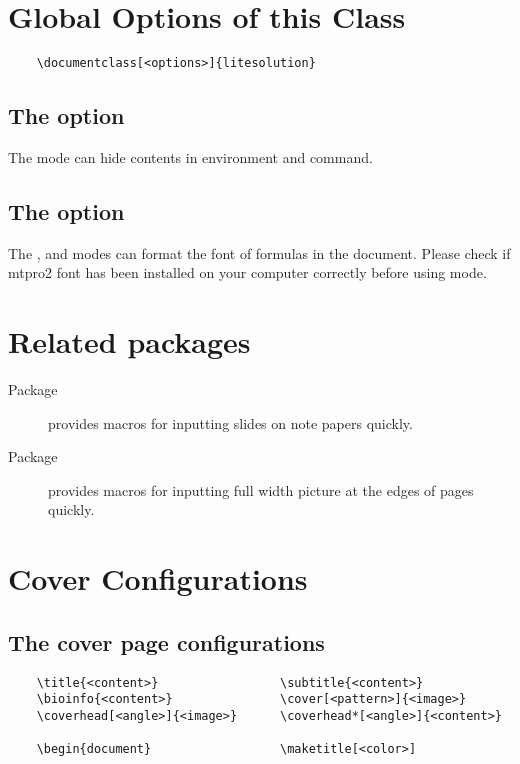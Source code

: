 \documentclass[mtpro2]{litesolution}
\begin{document}
\section{Global Options of this Class}

\begin{verbatim}
    \documentclass[<options>]{litesolution}
\end{verbatim}

\subsection{The  option}

The  mode can hide contents in  environment and  command.

\subsection{The  option}

The ,  and  modes can format the font of formulas in the document. Please check if mtpro2 font has been installed on your computer correctly before using  mode.

\section{Related packages}
\begin{description}
    \item[Package ] provides macros for inputting slides on note papers quickly.
    \item[Package ] provides macros for inputting full width picture at the edges of pages quickly.
\end{description}

\section{Cover Configurations}

\subsection{The cover page configurations}

\begin{verbatim}
    \title{<content>}                 \subtitle{<content>}
    \bioinfo{<content>}               \cover[<pattern>]{<image>}
    \coverhead[<angle>]{<image>}      \coverhead*[<angle>]{<content>}

    \begin{document}                  \maketitle[<color>]
\end{verbatim}
\end{document}
